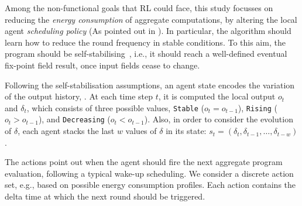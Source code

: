 Among the non-functional goals that \ac{RL} could face, 
 this study %
 focusses on reducing the \emph{energy consumption} of aggregate computations,
 by altering the local agent \emph{scheduling policy} (As pointed out in ).
%
%
%
In particular, the algorithm should learn how to reduce the round frequency in stable conditions. 
 To this aim, the program should be self-stabilising~\cite{DBLP:journals/tomacs/ViroliABDP18}, 
 i.e., it should reach a well-defined eventual fix-point field result, once input fields cease to change.

 Following the self-stabilisation assumptions, an agent state encodes the variation of the output history, .
 At each time step $t$, it is computed the local output $o_t$ and $\delta_t$, which consists of three possible values, \texttt{Stable} ($o_t = o_{t-1}$), \texttt{Rising} ($o_t > o_{t-1}$), and \texttt{Decreasing} ($o_ t < o_{t-1}$).
Also, in order to consider the evolution of $\delta$, each agent stacks the last $w$ values of $\delta$ in its state: $s_t =(\delta_t, \delta_{t-1}, \dots, \delta_{t-w})$.

The actions point out when the agent should fire the next aggregate program evaluation, following a typical wake-up scheduling.
%
We consider a discrete action set, e.g., based on possible energy consumption profiles.
% 
Each action contains the delta time at which the next round should be triggered. 

